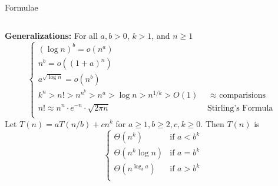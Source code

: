 \documentclass[10pt,a4paper]{article}
\begin{document}
\begin{multicols}{3}
\begin{textbox}{Formulae}
\begin{tabular}{c|p{}}
        \end{tabular}
        \linebreak
        {\bf Generalizations:} For all $a, b > 0$, $k > 1$, and $n \geq 1$
        \[\begin{cases}
                (\log n)^b = o(n^a)                                                                 \\
                n^b = o((1 + a)^n)                                                                  \\
                a^{\sqrt{\log n}} = o(n^b)                                                          \\
                k^n > n! > n^{n^b} > n^a > \log n > n^{1/k} > O(1) & \text{ $\approx$ comparisions} \\
                n! \approx n^n \cdot e^{-n} \cdot \sqrt{2\pi n}    & \text{ Stirling's Formula }    \\
            \end{cases}\]
         Let $T(n) = aT(n/b) + cn^k$ for $a \geq 1, b \geq 2, c, k \geq 0$. Then $T(n)$ is
        \[\begin{cases}
                \Theta(n^k)          & \text{if $a < b^k$} \\
                \Theta(n^k \log n)   & \text{if $a = b^k$} \\
                \Theta(n^{\log_b a}) & \text{if $a > b^k$} \\
            \end{cases}\]
    \end{textbox}


\end{multicols}
\end{document}
